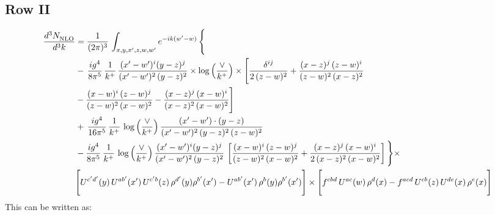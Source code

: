 \documentclass[9pt]{article}
\numberwithin{equation}{section}
\begin{document}
\subsection{Row II}
\begin{align}
     \frac{d^{3}N_{\rm NLO}^{\rm}}{d^{3}k}  & =   \frac{1}{(2\pi)^{3}}\, \int_{x,y,x',z,w,w^{\prime}} e^{-ik(w^{\prime}-w)}\, \Bigg\{\notag \\
& -\,\frac{ig^{4}}{8\pi^{5}}\,\frac{1}{k^{+}}\,\frac{(x'-w')^{i}(y-z)^{j}}{(x'-w')^{2}\,(y-z)^{2}}\times \log{\left(\frac{\vee}{k^{+}}\right)}\times \Bigg[\frac{\delta^{ij}}{2\,(z-w)^{2}}+\frac{(x-z)^{j}\,(z-w)^{i}}{(z-w)^{2}\,(x-z)^{2}}\notag \\ & -\frac{(x-w)^{i}\,(z-w)^{j}}{(z-w)^{2}\,(x-w)^{2}}-\frac{(x-z)^{j}\,(x-w)^{i}}{(x-z)^{2}\,(x-w)^{2}}\Bigg] \notag \\
& +\,\frac{ig^{4}}{16\pi^{5}}\,\frac{1}{k^{+}}\,\log{\left(\frac{\vee}{k^{+}}\right)}\, \frac{(x'-w')\cdot (y-z)}{(x'-w')^{2}\,(y-z)^{2}\,(z-w)^{2}} \notag \\
& -\frac{ig^{4}}{8\pi^{5}}\,\frac{1}{k^{+}}\,\log{\left(\frac{\vee}{k^{+}}\right)}\,\frac{(x'-w')^{i}(y-z)^{j}}{(x'-w')^{2}\,(y-z)^{2}}\,\left[\frac{(x-w)^{i}\,(z-w)^{j}}{(z-w)^{2}\,(x-w)^{2}}+\frac{(x-z)^{j}\,(x-w)^{i}}{2\,(x-z)^{2}\, (x-w)^{2}}\right]\Bigg\}\times \notag \\ & \Bigg[U^{c'd'}(y)\,U^{ab'}(x')\,U^{c'b}(z)\,\rho^{d'}(y)\rho^{b'}(x')-U^{ab'}(x')\,\rho^{b}(y)\rho^{b'}(x')\Bigg]\times\Bigg[f^{cbd}\,U^{ac}(w)\,\rho^{d}(x)-f^{acd}\, U^{cb}(z)\,U^{de}(x)\,\rho^{e}(x)\Bigg]
\end{align}
This can be written as:
\end{document}
